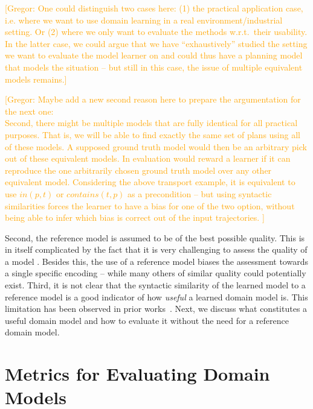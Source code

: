 \documentclass{article}
\theoremstyle{definition}
\theoremstyle{remark}
\newcommand{\gregor}[1]{{\textcolor{orange}{[Gregor: #1]}}}
\begin{document}
\gregor{One could distinguish two cases here: (1) the practical application case, i.e. where we want to use domain learning in a real environment/industrial setting. Or (2) where we only want to evaluate the methods w.r.t.\ their usability. In the latter case, we could argue that we have ``exhaustively'' studied the setting we want to evaluate the model learner on and could thus have a planning model that models the situation -- but still in this case, the issue of multiple equivalent models remains.}


\gregor{Maybe add a new second reason here to prepare the argumentation for the next one:\\
Second, there might be multiple models that are fully identical for all practical purposes.
That is, we will be able to find exactly the same set of plans using all of these models.
A supposed ground truth model would then be an arbitrary pick out of these equivalent models.
In evaluation would reward a learner if it can reproduce the one arbitrarily chosen ground truth model over any other equivalent model.
Considering the above transport example, it is equivalent to use $in(p,t)$ or $contains(t,p)$ as a precondition -- but using syntactic similarities forces the learner to have a bias for one of the two option, without being able to infer which bias is correct out of the input trajectories.
}

Second, the reference model is assumed to be of the best possible quality. This is in itself complicated by the fact that it is very challenging to assess the quality of a model \citep{DBLP:conf/kcap/McCluskeyVV17}. Besides this, the use of a reference model biases the assessment towards a single specific encoding -- while many others of similar quality could potentially exist.
Third, it is not clear that the syntactic similarity of the learned model to a reference model is a good indicator of how \emph{useful} a learned domain model is. This limitation has been observed in prior works~\citep{aineto2019learning,juba2021safe,mordoch2024safe}.
Next, we discuss what constitutes a useful domain model and how to evaluate it without the need for a reference domain model.




\section{Metrics for Evaluating Domain Models}
\end{document}
